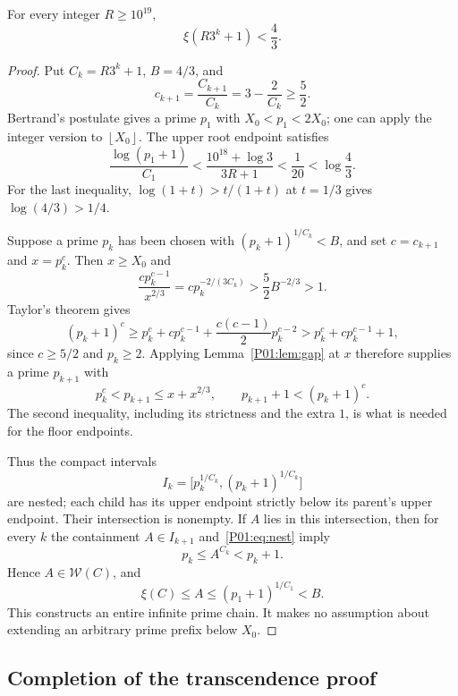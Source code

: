 \documentclass[11pt,a4paper]{article}
\theoremstyle{definition}\newtheorem{definition}[theorem]{Definition}
\theoremstyle{remark}\newtheorem{remark}[theorem]{Remark}
\newcommand{\floor}[1]{\left\lfloor#1\right\rfloor}
\begin{document}
\begin{proposition}\label{P01:prop:upper}
For every integer $R\geq10^{19}$,
\[
                     \xi(R3^k+1)<\frac43.
\]
\end{proposition}
\begin{proof}
Put $C_k=R3^k+1$, $B=4/3$, and
\[
 c_{k+1}=\frac{C_{k+1}}{C_k}=3-\frac2{C_k}\geq\frac52.
\]
Bertrand's postulate gives a prime $p_1$ with $X_0<p_1<2X_0$;
one can apply the integer version to $\floor{X_0}$.
The upper root endpoint satisfies
\[
 \frac{\log(p_1+1)}{C_1}
  <\frac{10^{18}+\log3}{3R+1}<\frac1{20}
  <\log\frac43.
\]
For the last inequality, $\log(1+t)>t/(1+t)$ at $t=1/3$
gives $\log(4/3)>1/4$.

Suppose a prime $p_k$ has been chosen with
$(p_k+1)^{1/C_k}<B$, and set $c=c_{k+1}$ and $x=p_k^c$.
Then $x\geq X_0$ and
\begin{equation}\label{P01:eq:width}
 \frac{c p_k^{c-1}}{x^{2/3}}
   =c p_k^{-2/(3C_k)}
   >\frac52 B^{-2/3}>1.
\end{equation}
Taylor's theorem gives
\[
 (p_k+1)^c\geq p_k^c+c p_k^{c-1}
                +\frac{c(c-1)}2p_k^{c-2}
           >p_k^c+c p_k^{c-1}+1,
\]
since $c\geq5/2$ and $p_k\geq2$.
Applying Lemma~\ref{P01:lem:gap} at $x$ therefore supplies a prime
$p_{k+1}$ with
\begin{equation}\label{P01:eq:nest}
 p_k^c<p_{k+1}\leq x+x^{2/3},\qquad
             p_{k+1}+1<(p_k+1)^c.
\end{equation}
The second inequality, including its strictness and the extra $1$,
is what is needed for the floor endpoints.

Thus the compact intervals
\[
 I_k=\bigl[p_k^{1/C_k},(p_k+1)^{1/C_k}\bigr]
\]
are nested; each child has its upper endpoint strictly below its
parent's upper endpoint. Their intersection is nonempty.
If $A$ lies in this intersection, then for every $k$ the containment
$A\in I_{k+1}$ and~\eqref{P01:eq:nest} imply
\[
                  p_k\leq A^{C_k}<p_k+1.
\]
Hence $A\in\mathcal W(C)$, and
\[
 \xi(C)\leq A\leq(p_1+1)^{1/C_1}<B.
\]
This constructs an entire infinite prime chain. It makes no assumption
about extending an arbitrary prime prefix below $X_0$.
\end{proof}

\subsection{Completion of the transcendence proof}
\end{document}
